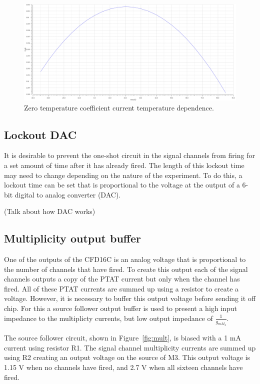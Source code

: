 \documentclass[12pt,oneside,final]{siuethesis}
\theoremstyle{definition}
\begin{document}
\begin{figure}[htbp!]
\centering
\includegraphics[scale=.3,keepaspectratio=true]{../data/ztc.png} 
\caption{Zero temperature coefficient current temperature dependence.}
\label{fig:ztc-temp}
\end{figure}

\subsection{Lockout DAC}
\par It is desirable to prevent the one-shot circuit in the signal channels from firing for a set amount of time after it has already fired. The length of this lockout time may need to change depending on the nature of the experiment. To do this, a lockout time can be set that is proportional to the voltage at the output of a 6-bit digital to analog converter (DAC). 
\par (Talk about how DAC works)

\subsection{Multiplicity output buffer}
\par One of the outputs of the CFD16C is an analog voltage that is proportional to the number of channels that have fired. To create this output each of the signal channels outputs a copy of the PTAT current but only when the channel has fired. All of these PTAT currents are summed up using a resistor to create a voltage. However, it is necessary to buffer this output voltage before sending it off chip. For this a source follower output buffer is used to present a high input impedance to the multiplicty currents, but low output impedance of $\frac{1}{g_{m M_{2}}}$. 
\par The source follower circuit, shown in Figure~\ref{fig:mult}, is biased with a 1 mA current using resistor R1. The signal channel multiplicity currents are summed up using R2 creating an output voltage on the source of M3. This output voltage is 1.15 V when no channels have fired, and 2.7 V when all sixteen channels have fired. 
\end{document}
